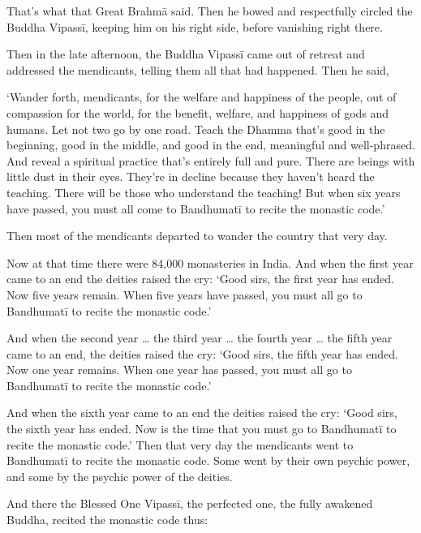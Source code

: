 \documentclass[12pt,openany]{book}%
\begin{document}
That’s what that Great \textsanskrit{Brahmā} said. Then he bowed and respectfully circled the Buddha \textsanskrit{Vipassī}, keeping him on his right side, before vanishing right there. 

Then in the late afternoon, the Buddha \textsanskrit{Vipassī} came out of retreat and addressed the mendicants, telling them all that had happened. Then he said, 

‘Wander forth, mendicants, for the welfare and happiness of the people, out of compassion for the world, for the benefit, welfare, and happiness of gods and humans. Let not two go by one road. Teach the Dhamma that’s good in the beginning, good in the middle, and good in the end, meaningful and well-phrased. And reveal a spiritual practice that’s entirely full and pure. There are beings with little dust in their eyes. They’re in decline because they haven’t heard the teaching. There will be those who understand the teaching! But when six years have passed, you must all come to \textsanskrit{Bandhumatī} to recite the monastic code.’ 

Then most of the mendicants departed to wander the country that very day. 

Now at that time there were 84,000 monasteries in India. And when the first year came to an end the deities raised the cry: ‘Good sirs, the first year has ended. Now five years remain. When five years have passed, you must all go to \textsanskrit{Bandhumatī} to recite the monastic code.’ 

And when the second year … the third year … the fourth year … the fifth year came to an end, the deities raised the cry: ‘Good sirs, the fifth year has ended. Now one year remains. When one year has passed, you must all go to \textsanskrit{Bandhumatī} to recite the monastic code.’ 

And when the sixth year came to an end the deities raised the cry: ‘Good sirs, the sixth year has ended. Now is the time that you must go to \textsanskrit{Bandhumatī} to recite the monastic code.’ Then that very day the mendicants went to \textsanskrit{Bandhumatī} to recite the monastic code. Some went by their own psychic power, and some by the psychic power of the deities. 

And there the Blessed One \textsanskrit{Vipassī}, the perfected one, the fully awakened Buddha, recited the monastic code thus: 
\end{document}
